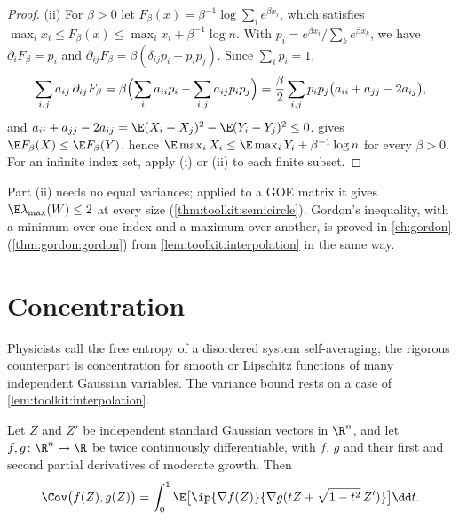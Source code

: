 \begin{refsection}
\begin{proof}
(ii) For $\beta>0$ let $F_\beta(x)=\beta^{-1}\log\sum_ie^{\beta x_i}$, which satisfies $\max_ix_i\le F_\beta(x)\le\max_ix_i+\beta^{-1}\log n$. With $p_i=e^{\beta x_i}/\sum_ke^{\beta x_k}$, we have $\partial_iF_\beta=p_i$ and $\partial_{ij}F_\beta=\beta(\delta_{ij}p_i-p_ip_j)$. Since $\sum_ip_i=1$,
\[
\sum_{i,j}a_{ij}\,\partial_{ij}F_\beta=\beta\Bigl(\sum_ia_{ii}p_i-\sum_{i,j}a_{ij}p_ip_j\Bigr)=\frac\beta2\sum_{i,j}p_ip_j\bigl(a_{ii}+a_{jj}-2a_{ij}\bigr),
\]
and $a_{ii}+a_{jj}-2a_{ij}=\E(X_i-X_j)^2-\E(Y_i-Y_j)^2\le0$.  gives $\E F_\beta(X)\le\E F_\beta(Y)$, hence $\E\max_iX_i\le\E\max_iY_i+\beta^{-1}\log n$ for every $\beta>0$. For an infinite index set, apply (i) or (ii) to each finite subset.
\end{proof}

Part (ii) needs no equal variances; applied to a GOE matrix it gives $\E\lambda_{\max}(W)\le2$ at every size (\cref{thm:toolkit:semicircle}). Gordon's inequality, with a minimum over one index and a maximum over another, is proved in \cref{ch:gordon} (\cref{thm:gordon:gordon}) from \cref{lem:toolkit:interpolation} in the same way.

\section{Concentration}\label{sec:toolkit:concentration}

Physicists call the free entropy of a disordered system self-averaging; the rigorous counterpart is concentration for smooth or Lipschitz functions of many independent Gaussian variables. The variance bound rests on a case of \cref{lem:toolkit:interpolation}.

\begin{lemma}\label{lem:toolkit:covariance}
Let $Z$ and $Z'$ be independent standard Gaussian vectors in $\R^n$, and let $f,g\colon\R^n\to\R$ be twice continuously differentiable, with $f$, $g$ and their first and second partial derivatives of moderate growth. Then
\[
\Cov\bigl(f(Z),g(Z)\bigr)=\int_0^1\E\bigl[\ip{\nabla f(Z)}{\nabla g(tZ+\sqrt{1-t^2}\,Z')}\bigr]\dd t.
\]
\end{lemma}


\end{refsection}
